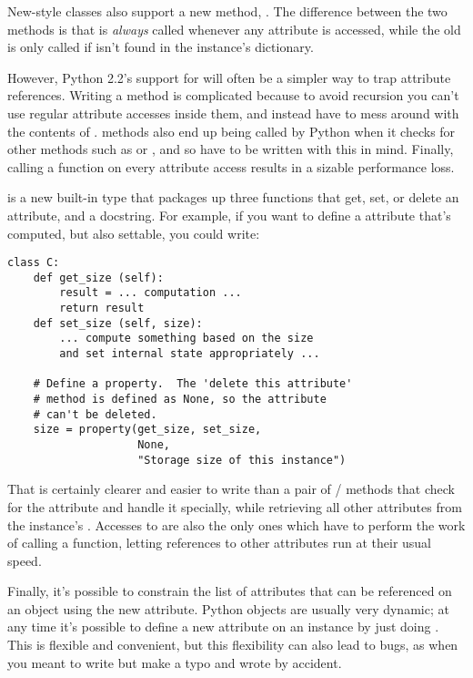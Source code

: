 \documentclass{howto}
\begin{document}
New-style classes also support a new method,
.  The difference between
the two methods is that  is \emph{always}
called whenever any attribute is accessed, while the old
 is only called if  isn't found in the
instance's dictionary.

However, Python 2.2's support for  will often be a
simpler way to trap attribute references.  Writing a
 method is complicated because to avoid recursion
you can't use regular attribute accesses inside them, and instead have
to mess around with the contents of .
 methods also end up being called by Python when
it checks for other methods such as  or
, and so have to be written with this in mind.
Finally, calling a function on every attribute access results in a
sizable performance loss.

 is a new built-in type that packages up three
functions that get, set, or delete an attribute, and a docstring.  For
example, if you want to define a  attribute that's
computed, but also settable, you could write:

\begin{verbatim}
class C:
    def get_size (self):
        result = ... computation ...
        return result
    def set_size (self, size):
        ... compute something based on the size
        and set internal state appropriately ...

    # Define a property.  The 'delete this attribute'
    # method is defined as None, so the attribute
    # can't be deleted.
    size = property(get_size, set_size,
                    None,
                    "Storage size of this instance")
\end{verbatim}

That is certainly clearer and easier to write than a pair of
/ methods that check for the
 attribute and handle it specially, while retrieving all
other attributes from the instance's .  Accesses to
 are also the only ones which have to perform the work of
calling a function, letting references to other attributes run at
their usual speed.

Finally, it's possible to constrain the list of attributes that can be
referenced on an object using the new  attribute.
Python objects are usually very dynamic; at any time it's possible to
define a new attribute on an instance by just doing
.  This is flexible and convenient, but this
flexibility can also lead to bugs, as when you meant to write
 but make a typo and wrote
 by accident.  
\end{document}
